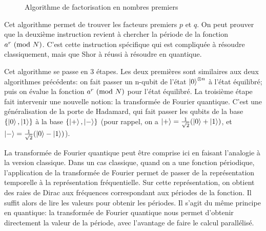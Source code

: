 \pagebreak
\begin{figure}[h]
  

\begin{algorithm}[H]
  \SetAlgoLined
\end{algorithm}
\caption{Algorithme de factorisation en nombres premiers}
\label{fig:algoshor}
\end{figure}


Cet algorithme permet de trouver les facteurs premiers $p$ et $q$. On peut prouver que la deuxième instruction revient à chercher la période de la fonction $a^r \ (\mathrm{mod}\ N)$. C'est cette instruction spécifique qui est compliquée à résoudre classiquement, mais que Shor à réussi à résoudre en quantique.

Cet algorithme se passe en 3 étapes. Les deux premières sont similaires aux deux algorithmes précédents: on fait passer un n-qubit de l'état $\ket{0}^{\otimes n}$ à l'état équilibré; puis on évalue la fonction $a^r \ (\mathrm{mod}\ N)$ pour l'état équilibré. La troisième étape fait intervenir une nouvelle notion: la transformée de Fourier quantique. C'est une généralisation de la porte de Hadamard, qui fait passer les qubits de la base $\{\ket{0}, \ket{1}\}$ à la base $\{\ket{+}, \ket{-}\}$ (pour rappel, on a $\ket{+} = \frac{1}{\sqrt{2}}(\ket{0} + \ket{1})$, et $\ket{-} = \frac{1}{\sqrt{2}}(\ket{0} - \ket{1})$).

La transformée de Fourier quantique peut être comprise ici en faisant l'analogie à la version classique. Dans un cas classique, quand on a une fonction périodique, l'application de la transformée de Fourier permet de passer de la représentation temporelle à la représentation fréquentielle. Sur cette représentation, on obtient des raies de Dirac aux fréquences correspondant aux périodes de la fonction. Il suffit alors de lire les valeurs pour obtenir les périodes. Il s'agit du même principe en quantique: la transformée de Fourier quantique nous permet d'obtenir directement la valeur de la période, avec l'avantage de faire le calcul parallélisé.

